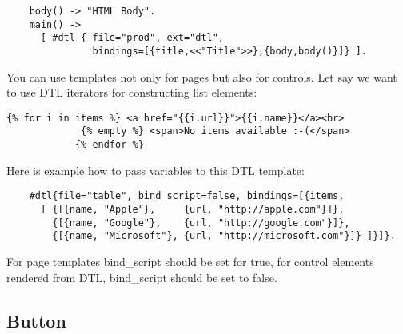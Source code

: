 \vspace{1\baselineskip}
\begin{lstlisting}
    body() -> "HTML Body".
    main() ->
      [ #dtl { file="prod", ext="dtl",
               bindings=[{title,<<"Title">>},{body,body()}]} ].
\end{lstlisting}
\vspace{1\baselineskip}

You can use templates not only for pages but also for controls. Let say we want
to use DTL iterators for constructing list elements:

\vspace{1\baselineskip}
\begin{lstlisting}[caption=table.html]
    {% for i in items %} <a href="{{i.url}}">{{i.name}}</a><br>
             {% empty %} <span>No items available :-(</span>
            {% endfor %}
\end{lstlisting}
\vspace{1\baselineskip}

Here is example how to pass variables to this DTL template:

\vspace{1\baselineskip}
\begin{lstlisting}
    #dtl{file="table", bind_script=false, bindings=[{items,
      [ {[{name, "Apple"},     {url, "http://apple.com"}]},
        {[{name, "Google"},    {url, "http://google.com"}]},
        {[{name, "Microsoft"}, {url, "http://microsoft.com"}]} ]}]}.
\end{lstlisting}
\vspace{1\baselineskip}

For page templates bind\_script should be set for true, for control elements rendered from DTL,
bind\_script should be set to false.

\subsection{Button}

